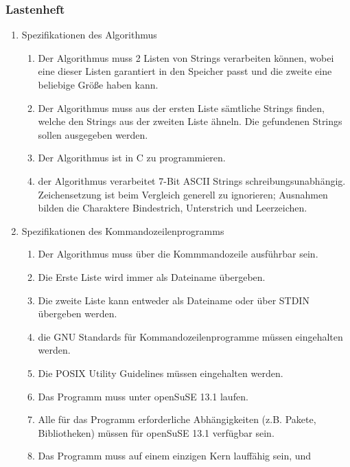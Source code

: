 \subsubsection{Lastenheft}
\renewcommand{\labelenumii}{\theenumii}
\renewcommand{\theenumii}{\theenumi.\arabic{enumii}.}
\begin{enumerate}
    \item Spezifikationen des Algorithmus
        \begin{enumerate}
            \item Der Algorithmus muss 2 Listen von Strings verarbeiten können,
            wobei eine dieser Listen garantiert in den Speicher passt und die zweite
            eine beliebige Größe haben kann.
            \item Der Algorithmus muss aus der ersten Liste sämtliche Strings finden,
            welche den Strings aus der zweiten Liste ähneln. Die gefundenen Strings
            sollen ausgegeben werden.
            \item Der Algorithmus ist in C zu programmieren.
            \item der Algorithmus verarbeitet 7-Bit ASCII Strings schreibungsunabhängig. Zeichensetzung
            ist beim Vergleich generell zu ignorieren; Ausnahmen bilden die
            Charaktere Bindestrich, Unterstrich und Leerzeichen.
        \end{enumerate}
    \item Spezifikationen des Kommandozeilenprogramms
        \begin{enumerate}
            \item Der Algorithmus muss über die Kommmandozeile ausführbar sein.
            \item Die Erste Liste wird immer als Dateiname übergeben.
            \item Die zweite Liste kann entweder als Dateiname oder über STDIN übergeben werden.
            \item die GNU Standards für Kommandozeilenprogramme müssen eingehalten werden.
            \item Die POSIX Utility Guidelines müssen eingehalten werden.
            \item Das Programm muss unter openSuSE 13.1 laufen.
            \item Alle für das Programm erforderliche Abhängigkeiten
            (z.B. Pakete, Bibliotheken) müssen für openSuSE 13.1 verfügbar sein.
            \item Das Programm muss auf einem einzigen Kern lauffähig sein, und

\end{enumerate}
\end{enumerate}
